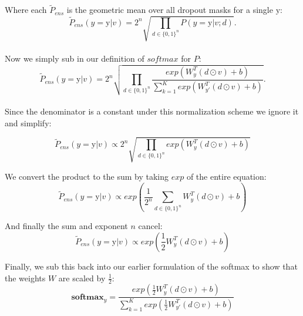 \documentclass{amsart}
\theoremstyle{definition}
\theoremstyle{remark}
\numberwithin{equation}{section}
\begin{document}
Where each $\tilde{P}_{ens}$ is the geometric mean over all dropout masks for a single $\mbox{y}$: \\

\begin{equation}
\tilde{P}_{ens}(y = \mbox{y} | v) = 2^n \sqrt{ \prod_{d \in \{0, 1\}^n} P(y = \mbox{y} | v;d ) }.
\end{equation} \\

Now we simply sub in our definition of $softmax$ for $P$: \\

\begin{equation}
\tilde{P}_{ens}(y = \mbox{y} | v) = 2^n \sqrt{ \prod_{d \in \{0, 1\}^n}
                \frac{exp \left( W_y^T(d \odot v) + b \right)}
                     {\sum_{k=1}^K exp \left( W_{y'}^T(d \odot v) + b \right)}}.
\end{equation} \\

Since the denominator is a constant under this normalization scheme we ignore it
and simplify:

\begin{equation}
\tilde{P}_{ens}(y = \mbox{y} | v) \propto 2^n \sqrt{ \prod_{d \in \{0, 1\}^n} exp \left( W_y^T(d \odot v) + b \right)}
\end{equation}

We convert the product to the sum by taking $exp$ of the entire equation: \\

\begin{equation}
\tilde{P}_{ens}(y = \mbox{y} | v) \propto exp \left( \frac{1}{2^n} \sum_{d \in \{0, 1\}^n} W_y
^T(d \odot v) + b \right)
\end{equation}

And finally the sum and exponent $n$ cancel: \\

\begin{equation}
\tilde{P}_{ens}(y = \mbox{y} | v) \propto exp \left( \frac{1}{2}  W_y^T(d \odot v) + b \right)
\end{equation}

Finally, we sub this back into our earlier formulation of the softmax to show
that the weights $W$ are scaled by $\frac{1}{2}$: \\

\begin{equation}
\mathbf{softmax}_y = \frac{exp \left( \frac{1}{2}W_y^T(d \odot v) + b \right)}
                          {\sum_{k=1}^K exp \left( \frac{1}{2}W_{y'}^T(d \odot v) + b \right)}
\end{equation} \\
\end{document}
